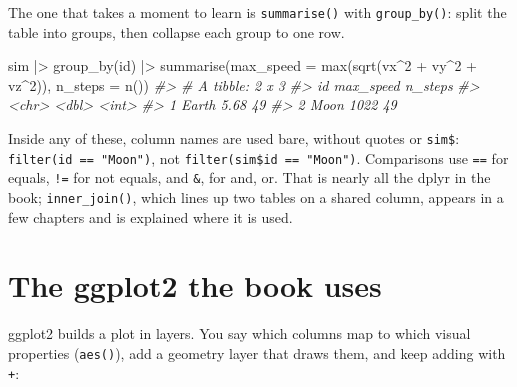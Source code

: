 \documentclass[
  10.5pt,
  letterpaper,
]{scrbook}
\newenvironment{Shaded}{\begin{snugshade}}{\end{snugshade}}
\newcommand{\AttributeTok}[1]{\textcolor[rgb]{0.00,0.00,0.00}{#1}}
\newcommand{\CommentTok}[1]{\textcolor[rgb]{0.00,0.00,0.00}{\textit{#1}}}
\newcommand{\DecValTok}[1]{\textcolor[rgb]{0.00,0.00,0.00}{#1}}
\newcommand{\FunctionTok}[1]{\textcolor[rgb]{0.00,0.00,0.00}{#1}}
\newcommand{\NormalTok}[1]{\textcolor[rgb]{0.00,0.00,0.00}{#1}}
\newcommand{\SpecialCharTok}[1]{\textcolor[rgb]{0.00,0.00,0.00}{#1}}
\theoremstyle{definition}
\theoremstyle{plain}
\theoremstyle{remark}
\begin{document}
The one that takes a moment to learn is \texttt{summarise()} with
\texttt{group\_by()}: split the table into groups, then collapse each
group to one row.

\begin{Shaded}
\begin{Highlighting}[]
\NormalTok{sim }\SpecialCharTok{|\textgreater{}}
  \FunctionTok{group\_by}\NormalTok{(id) }\SpecialCharTok{|\textgreater{}}
  \FunctionTok{summarise}\NormalTok{(}\AttributeTok{max\_speed =} \FunctionTok{max}\NormalTok{(}\FunctionTok{sqrt}\NormalTok{(vx}\SpecialCharTok{\^{}}\DecValTok{2} \SpecialCharTok{+}\NormalTok{ vy}\SpecialCharTok{\^{}}\DecValTok{2} \SpecialCharTok{+}\NormalTok{ vz}\SpecialCharTok{\^{}}\DecValTok{2}\NormalTok{)),}
            \AttributeTok{n\_steps   =} \FunctionTok{n}\NormalTok{())}
\CommentTok{\#\textgreater{} \# A tibble: 2 x 3}
\CommentTok{\#\textgreater{}   id    max\_speed n\_steps}
\CommentTok{\#\textgreater{}   \textless{}chr\textgreater{}     \textless{}dbl\textgreater{}   \textless{}int\textgreater{}}
\CommentTok{\#\textgreater{} 1 Earth      5.68      49}
\CommentTok{\#\textgreater{} 2 Moon    1022         49}
\end{Highlighting}
\end{Shaded}

Inside any of these, column names are used bare, without quotes or
\texttt{sim\$}: \texttt{filter(id\ ==\ "Moon")}, not
\texttt{filter(sim\$id\ ==\ "Moon")}. Comparisons use \texttt{==} for
equals, \texttt{!=} for not equals, and \texttt{\&}, \texttt{\textbar{}}
for and, or. That is nearly all the dplyr in the book;
\texttt{inner\_join()}, which lines up two tables on a shared column,
appears in a few chapters and is explained where it is used.

\section{The ggplot2 the book uses}\label{the-ggplot2-the-book-uses}

ggplot2 builds a plot in layers. You say which columns map to which
visual properties (\texttt{aes()}), add a geometry layer that draws
them, and keep adding with \texttt{+}:
\end{document}
